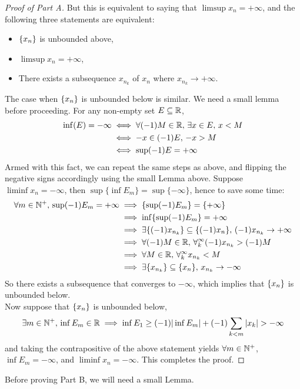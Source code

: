 \documentclass[../../main.tex]{subfiles}
\begin{document}
\begin{proof}[Proof of Part A]
    But this is equivalent to saying that $\limsup x_n=+\infty$, and the following three statements are equivalent:
    \begin{itemize}
        \item $\{x_n\}$ is unbounded above,
        \item $\limsup x_n = +\infty$,
        \item There exists a subsequence $x_{n_k}$ of $x_n$ where $x_{n_k}\to+\infty$.
    \end{itemize}
    The case when $\{x_n\}$ is unbounded below is similar. We need a small lemma before proceeding. For any non-empty set $E\subseteq\mathbb{R}$,
    \begin{align*}
        \inf(E)=-\infty &\iff \forall (-1)M\in\mathbb{R},\, \exists x\in E,\, x<M\\
        &\iff -x\in (-1)E,\, -x>M\\
        &\iff \sup (-1)E=+\infty
    \end{align*}
    Armed with this fact, we can repeat the same steps as above, and flipping the negative signs accordingly using the small Lemma above. Suppose $\liminf x_n=-\infty$,  then $\sup\{\inf E_m\}=\sup \{-\infty\}$, hence to save some time:
    \begin{align*}
    \forall m\in\mathbb{N}^+,\, \sup (-1)E_m=+\infty &\implies \{\sup (-1)E_m\}=\{+\infty\}\\
    &\implies \inf\{\sup (-1)E_m\}=+\infty\\
    &\implies \exists \{(-1)x_{n_k}\}\subseteq\{(-1)x_n\},\, (-1)x_{n_k}\to+\infty\\
    &\implies \forall (-1)M\in\mathbb{R},\,\forall^\infty_k (-1)x_{n_k}>(-1)M\\
    &\implies \forall M\in\mathbb{R},\, \forall^\infty_k x_{n_k}<M\\
    &\implies \exists\{x_{n_k}\}\subseteq\{x_n\},\, x_{n_k}\to-\infty\\
    \end{align*}
    So there exists a subsequence that converges to $-\infty$, which implies that $\{x_n\}$ is unbounded below.\\
    
    Now suppose that $\{x_n\}$ is unbounded below,
    \[
        \exists m\in\nat^+,\, \inf E_m\in\real\implies \inf E_1\geq (-1)|\inf E_m| + (-1)\sum_{k<m}|x_k|>-\infty
    \]
    and taking the contrapositive of the above statement yields $\forall m\in\mathbb{N}^+$, $\inf E_m = -\infty$, and $\liminf x_n=-\infty$. This completes the proof.
\end{proof}
Before proving Part B, we will need a small Lemma.
% 
\end{document}
